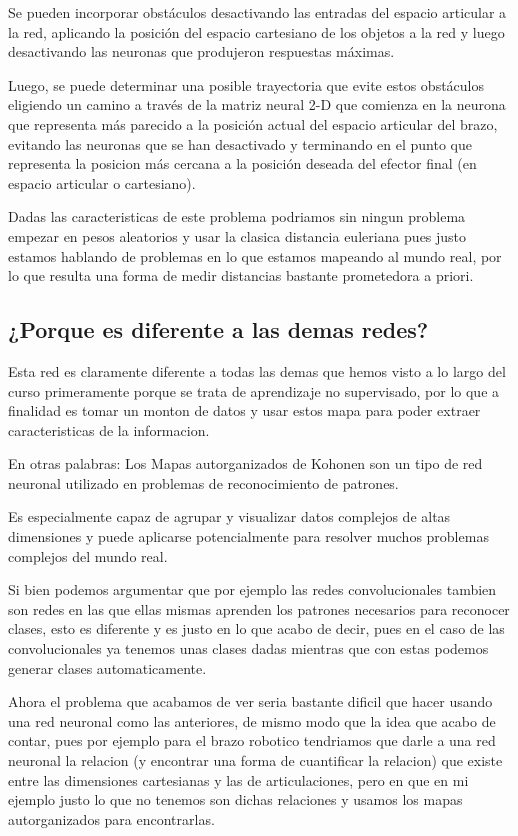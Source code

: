 \documentclass[fleqn, journal, onecolumn]{IEEEtran}             %
\theoremstyle{break}                                            %
\begin{document}
      Se pueden incorporar obstáculos desactivando las entradas del espacio articular a la red, 
      aplicando la posición del espacio cartesiano de los objetos a la red y
      luego desactivando las neuronas que produjeron respuestas máximas. 
      
      Luego, se puede determinar una posible trayectoria que evite estos obstáculos
      eligiendo un camino a través de la matriz neural 2-D que comienza en la neurona
      que representa más parecido a la posición actual del espacio articular del brazo, 
      evitando las neuronas que se han desactivado y terminando en el punto que representa la posicion
      más cercana a la posición deseada del efector final (en espacio articular o cartesiano).

      Dadas las caracteristicas de este problema podriamos sin ningun problema empezar en pesos aleatorios
      y usar la clasica distancia euleriana pues justo estamos hablando de problemas en lo que estamos
      mapeando al mundo real, por lo que resulta una forma de medir distancias bastante prometedora
      a priori.

    \subsection{¿Porque es diferente a las demas redes?}

      Esta red es claramente diferente a todas las demas que hemos visto a lo largo del curso
      primeramente porque se trata de aprendizaje no supervisado, por lo que a finalidad es 
      tomar un monton de datos y usar estos mapa para poder extraer caracteristicas de la informacion.

      En otras palabras: Los Mapas autorganizados de Kohonen son un
      tipo de red neuronal utilizado en problemas de reconocimiento de patrones.

      Es especialmente capaz de agrupar y visualizar datos complejos de altas dimensiones y
      puede aplicarse potencialmente para resolver muchos problemas complejos del mundo real.

      Si bien podemos argumentar que por ejemplo las redes convolucionales tambien son
      redes en las que ellas mismas aprenden los patrones necesarios para reconocer clases,
      esto es diferente y es justo en lo que acabo de decir, pues en el caso de las convolucionales
      ya tenemos unas clases dadas mientras que con estas podemos generar clases automaticamente.

      Ahora el problema que acabamos de ver seria bastante dificil que hacer usando una red
      neuronal como las anteriores, de mismo modo que la idea que acabo de contar, pues por ejemplo
      para el brazo robotico tendriamos que darle a una red neuronal la relacion (y encontrar
      una forma de cuantificar la relacion) que existe entre las dimensiones cartesianas y las 
      de articulaciones, pero en que en mi ejemplo justo lo que no tenemos son dichas relaciones
      y usamos los mapas autorganizados para encontrarlas.
\end{document}
